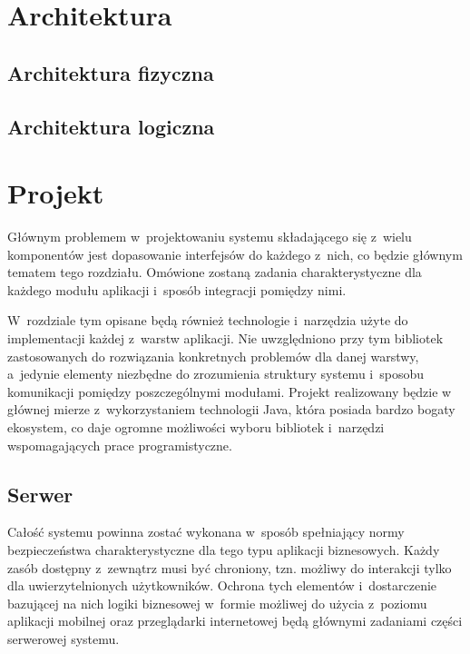\documentclass[11pt]{aghdpl}
\begin{document}

\chapter{Architektura}
\label{cha:architektura}

\section{Architektura fizyczna}
\label{sec:architektura_fizyczna}

\section{Architektura logiczna}
\label{sec:architektura_logiczna}


\chapter{Projekt}
\label{cha:dobor_technologii_i_narzedzi}

Głównym problemem w~projektowaniu systemu składającego się z~wielu komponentów jest dopasowanie interfejsów do każdego z~nich, co będzie głównym tematem tego rozdziału. Omówione zostaną zadania charakterystyczne dla każdego modułu aplikacji i~sposób integracji pomiędzy nimi.

W~rozdziale tym opisane będą również technologie i~narzędzia użyte do implementacji każdej z~warstw aplikacji. Nie uwzględniono przy tym bibliotek zastosowanych do rozwiązania konkretnych problemów dla danej warstwy, a~jedynie elementy niezbędne do zrozumienia struktury systemu i~sposobu komunikacji pomiędzy poszczególnymi modułami. Projekt realizowany będzie w głównej mierze z~wykorzystaniem technologii Java, która posiada bardzo bogaty ekosystem, co daje ogromne możliwości wyboru bibliotek i~narzędzi wspomagających prace programistyczne.

\section {Serwer}

Całość systemu powinna zostać wykonana w~sposób spełniający normy bezpieczeństwa charakterystyczne dla tego typu aplikacji biznesowych. Każdy zasób dostępny z~zewnątrz musi być chroniony, tzn. możliwy do interakcji tylko dla uwierzytelnionych użytkowników. Ochrona tych elementów i~dostarczenie bazującej na nich logiki biznesowej w~formie możliwej do użycia z~poziomu aplikacji mobilnej oraz przeglądarki internetowej będą głównymi zadaniami części serwerowej systemu.
\end{document}
